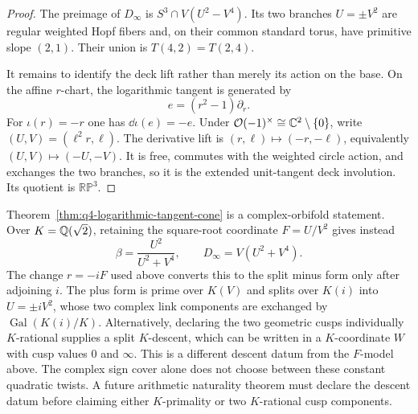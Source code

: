 \begin{proof}
The preimage of $D_\infty$ is
$S^3\cap V(U^2-V^4)$.  Its two branches $U=\pm V^2$ are regular weighted Hopf
fibers and, on their common standard torus, have primitive slope $(2,1)$.
Their union is $T(4,2)=T(2,4)$.

It remains to identify the deck lift rather than merely its action on the base.
On the affine $r$-chart, the logarithmic tangent is generated by
\begin{equation}
 e=(r^2-1)\partial_r.
 \label{eq:q4-log-tangent-deck-frame}
\end{equation}
For $\iota(r)=-r$ one has $\dd\iota(e)=-e$.  Under
$\mathcal O(-1)^\times\cong\mathbb{C}^2\setminus\{0\}$, write
$(U,V)=(\ell^2r,\ell)$.  The derivative lift is
$(r,\ell)\mapsto(-r,-\ell)$, equivalently
$(U,V)\mapsto(-U,-V)$.  It is free, commutes with the weighted circle action,
and exchanges the two branches, so it is the extended unit-tangent deck
involution.  Its quotient is $\mathbb {RP}^3$.
\end{proof}

\begin{remark}
\label{rem:q4-log-cone-arithmetic-twist}
Theorem~\ref{thm:q4-logarithmic-tangent-cone} is a complex-orbifold statement.
Over $K=\mathbb{Q}(\sqrt2)$, retaining the square-root coordinate $F=U/V^2$ gives
instead
\begin{equation}
 \beta=\frac{U^2}{U^2+V^4},
 \qquad
 D_\infty=V(U^2+V^4).
 \label{eq:q4-arithmetic-plus-twist}
\end{equation}
The change $r=-iF$ used above converts this to the split minus form only after
adjoining $i$.  The plus form is prime over $K(V)$ and splits over $K(i)$ into
$U=\pm iV^2$, whose two complex link components are exchanged by
$\operatorname{Gal}(K(i)/K)$.  Alternatively, declaring the two geometric cusps
individually $K$-rational supplies a split $K$-descent, which can be written in a
$K$-coordinate $W$ with cusp values $0$ and $\infty$.  This is a different
descent datum from the $F$-model above.  The complex sign cover alone does not
choose between these constant quadratic twists.  A future arithmetic
naturality theorem must declare the descent datum before claiming either
$K$-primality or two $K$-rational cusp components.
\end{remark}


